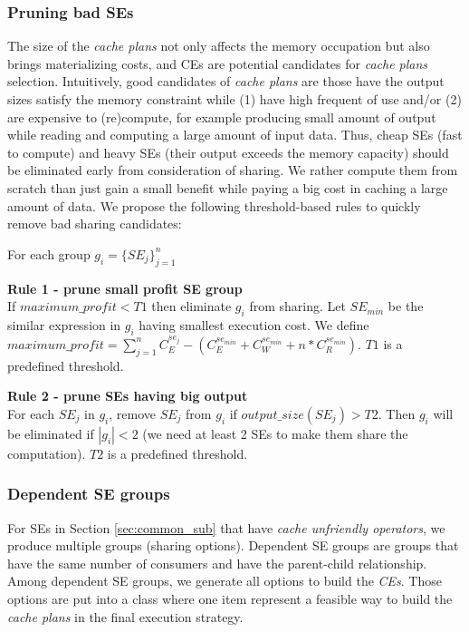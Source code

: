 
\subsubsection{Pruning bad SEs}
\label{sec:se-prune}
The size of the \emph{cache plans} not only affects the memory occupation but also brings materializing costs, and CEs are potential candidates for \emph{cache plans} selection. Intuitively, good candidates of \emph{cache plans} are those have the output sizes satisfy the memory constraint while (1) have high frequent of use and/or (2) are expensive to (re)compute, for example producing small amount of output while reading and computing a large amount of input data. Thus, cheap SEs (fast to compute) and heavy SEs (their output exceeds the memory capacity) should be eliminated early from consideration of sharing. We rather compute them from scratch than just gain a small benefit while paying a big cost in caching a large amount of data. We propose the following threshold-based rules to quickly remove bad sharing candidates:

For each group $g_i=\{SE_j\}_{j=1}^n$

\textbf{Rule 1 - prune small profit SE group}\\
If $maximum\_profit < T1$ then eliminate $g_i$ from sharing. Let $SE_{min}$ be the similar expression in $g_i$ having smallest execution cost. We define $maximum\_profit=\sum_{j=1}^{n}C_{E}^{se_j} - (C_{E}^{se_{min}} + C_{W}^{se_{min}} + n*C_{R}^{se_{min}})$. $T1$ is a predefined threshold.

\textbf{Rule 2 - prune SEs having big output}\\
For each $SE_j$ in $g_i$, remove $SE_j$ from $g_i$ if $output\_size(SE_j) > T2$. Then $g_i$ will be eliminated if $|g_i| < 2$ (we need at least 2 SEs to make them share the computation). $T2$ is a predefined threshold.

\subsubsection{Dependent SE groups}
For SEs in Section \ref{sec:common_sub} that have \emph{cache unfriendly operators}, we produce multiple groups (sharing options). Dependent SE groups are groups that have the same number of consumers and have the parent-child relationship. Among dependent SE groups, we generate all options to build the \emph{CEs}. Those options are put into a class where one item represent a feasible way to build the \emph{cache plans} in the final execution strategy.
